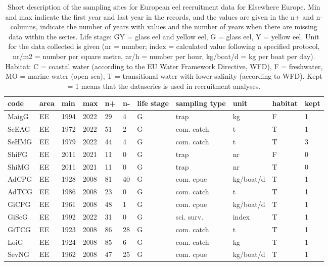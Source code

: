 \begin{table}[ht]
\centering
\caption{Short description of the sampling sites for European eel recruitment data for Elsewhere Europe. Min and max indicate the first year and last year in the records, and the values are given in the n+ and n- columns, indicate the number of years with values and the number of years when there are missing data within the series. Life stage: GY = glass eel and yellow eel, G = glass eel, Y = yellow eel. Unit for the data collected is given (nr = number; index = calculated value following a specified protocol, nr/m2 = number per square metre, nr/h = number per hour, kg/boat/d = kg per boat per day). Habitat: C = coastal water (according to the EU Water Framework Directive, WFD), F = freshwater, MO = marine water (open sea), T = transitional water with lower salinity (according to WFD). Kept = 1 means that the dataseries is used in recruitment analyses.} 
\label{statseriesG}
\begin{tabular}{p{1cm}p{1cm}p{1cm}p{1cm}p{0.8cm}p{0.8cm}p{1cm}p{2cm}p{2cm}p{1cm}p{1cm}}
  \hline
code & area & min & max & n+ & n- & life stage & sampling type & unit & habitat & kept \\ 
  \hline
MaigG & EE & 1994 & 2022 & 29 & 4 & G & trap & kg & F & 1 \\ 
  SeEAG & EE & 1972 & 2022 & 51 & 2 & G & com. catch & t & T & 1 \\ 
  SeHMG & EE & 1979 & 2022 & 44 & 4 & G & com. catch & t & T & 3 \\ 
  ShiFG & EE & 2011 & 2021 & 11 & 0 & G & trap & nr & F & 0 \\ 
  ShiMG & EE & 2011 & 2021 & 11 & 0 & G & trap & nr & T & 0 \\ 
  AdCPG & EE & 1928 & 2008 & 81 & 40 & G & com. cpue & kg/boat/d & T & 1 \\ 
  AdTCG & EE & 1986 & 2008 & 23 & 0 & G & com. catch & t & T & 1 \\ 
  GiCPG & EE & 1961 & 2008 & 48 & 1 & G & com. cpue & kg/boat/d & T & 1 \\ 
  GiScG & EE & 1992 & 2022 & 31 & 0 & G & sci. surv. & index & T & 1 \\ 
  GiTCG & EE & 1923 & 2008 & 86 & 28 & G & com. catch & t & T & 1 \\ 
  LoiG & EE & 1924 & 2008 & 85 & 6 & G & com. catch & kg & T & 1 \\ 
  SevNG & EE & 1962 & 2008 & 47 & 25 & G & com. cpue & kg/boat/d & T & 1 \\ 

\end{tabular}
\end{table}
